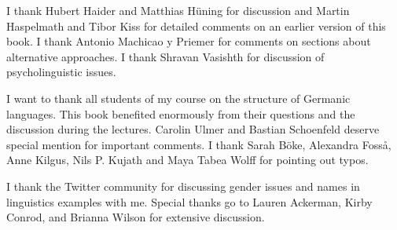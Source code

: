 \addchap{\lsAcknowledgementTitle} 

I thank Hubert Haider and Matthias Hüning for discussion and Martin Haspelmath and Tibor Kiss for detailed comments
on an earlier version of this book. I thank Antonio Machicao y Priemer for comments on sections
about alternative approaches. I thank Shravan Vasishth for discussion of psycholinguistic issues.

I want to thank all students of my course on the structure of Germanic languages. This book
benefited enormously from their questions and the discussion during the lectures. 
Carolin Ulmer %
and
Bastian Schoenfeld %
deserve special mention for important comments. I thank 
Sarah Böke,
Alexandra Fosså,
Anne Kilgus,
Nils P. Kujath
and 
Maya Tabea Wolff  
for pointing out typos.


I thank the Twitter community for discussing gender issues and names in linguistics examples with
me. Special thanks go to Lauren Ackerman, Kirby Conrod, and Brianna Wilson for extensive discussion.





